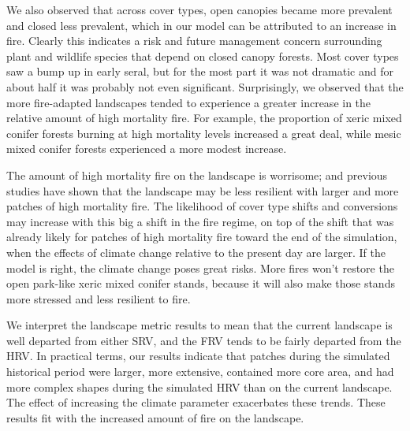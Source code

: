 \documentclass[12pt]{article}
\begin{document}
\begin{spacing}{1}
We also observed that across cover types, open canopies became more prevalent and closed less prevalent, which in our model can be attributed to an increase in fire. Clearly this indicates a risk and future management concern surrounding plant and wildlife species that depend on closed canopy forests. Most cover types saw a bump up in early seral, but for the most part it was not dramatic and for about half it was probably not even significant. Surprisingly, we observed that the more fire-adapted landscapes tended to experience a greater increase in the relative amount of high mortality fire. For example, the proportion of xeric mixed conifer forests burning at high mortality levels increased a great deal, while mesic mixed conifer forests experienced a more modest increase.

The amount of high mortality fire on the landscape is worrisome; and previous studies have shown that the landscape may be less resilient with larger and more patches of high mortality fire. The likelihood of cover type shifts and conversions may increase with this big a shift in the fire regime, on top of the shift that was already likely for patches of high mortality fire toward the end of the simulation, when the effects of climate change relative to the present day are larger. If the model is right, the climate change poses great risks. More fires won't restore the open park-like xeric mixed conifer stands, because it will also make those stands more stressed and less resilient to fire.

We interpret the landscape metric results to mean that the current landscape is well departed from either SRV, and the FRV tends to be fairly departed from the HRV. In practical terms, our results indicate that patches during the simulated historical period were larger, more extensive, contained more core area, and had more complex shapes during the simulated HRV than on the current landscape. The effect of increasing the climate parameter exacerbates these trends. These results fit with the increased amount of fire on the landscape.


\end{spacing}
\end{document}
